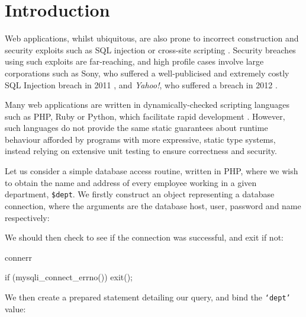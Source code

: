 \section{Introduction}

Web applications, whilst ubiquitous, are also prone to incorrect construction
and security exploits such as SQL injection \cite{owasp:sqli} or cross-site
scripting \cite{owasp:xss}. Security breaches using such exploits are
far-reaching, and high profile cases involve large corporations such as Sony,
who suffered a well-publicised and extremely costly SQL Injection breach in
2011 \cite{ieee:sony}, and \textit{Yahoo!}, who suffered a breach in 2012
\cite{imperva:yahoo}. 

Many web applications are written in dynamically-checked scripting languages
such as PHP, Ruby or Python, which facilitate rapid development
\cite{w3techs:webpls}. However, such languages
do not provide the same static guarantees about runtime behaviour afforded by
programs with more expressive, static type systems, instead relying on
extensive unit testing to ensure correctness and security. 

Let us consider a simple database access routine, written in
PHP, where we wish to obtain the name and address of every employee working in
a given department, \texttt{\$dept}. We firstly construct an object
representing a database connection, where the arguments are the database host,
user, password and name respectively:


\noindent
We should then check to see if the connection was successful, and exit
if not:

\begin{SaveVerbatim}{connerr}

if (mysqli_connect_errno()) { exit(); }

\end{SaveVerbatim}

\noindent
We then create a prepared statement detailing our query, and bind the
\texttt{`dept'} value:


